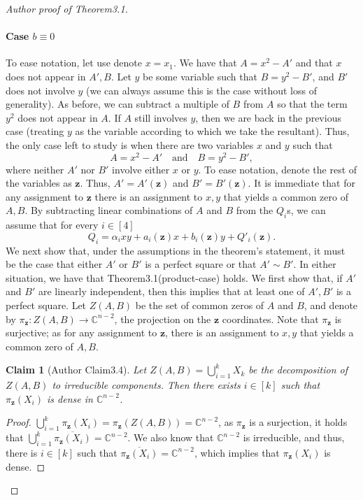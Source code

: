 \documentclass[10pt,a4paper]{article}
\newtheorem*{ntclaim}{Claim}
\begin{document}
\begin{proof}[Author proof of Theorem3.1]
\paragraph{Case $b\equiv0$}
To ease notation, let use denote $x=x_1$. We have that $A=x^2-A'$ and that $x$ does not appear in $A',B$. Let $y$ be some variable such that $B=y^2-B'$, and $B'$ does not involve $y$ (we can always assume this is the case without loss of generality). As before, we can subtract a multiple of $B$ from $A$ so that the term $y^2$ does not appear in $A$. If $A$ still involves $y$, then we are back in the previous case (treating $y$ as the variable according to which we take the resultant). Thus, the only case left to study is when there are two variables $x$ and $y$ such that
\[A=x^2-A'\quad\text{and}\quad B=y^2-B',\]
where neither $A'$ nor $B'$ involve either $x$ or $y$. To ease notation, denote the rest of the variables as $\mathbf z$. Thus, $A'=A'(\mathbf z)$ and $B'=B'(\mathbf z)$. It is immediate that for any assignment to $\mathbf z$ there is an assignment to $x,y$ that yields a common zero of $A,B$.
By subtracting linear combinations of $A$ and $B$ from the $Q_i$s, we can assume that for every $i\in[4]$
\[Q_i=\alpha_i xy+a_i(\mathbf z)x+b_i(\mathbf z)y+Q'_i(\mathbf z).\]
We next show that, under the assumptions in the theorem's statement, it must be the case that either $A'$ or $B'$ is a perfect square or that $A'\sim B'$. In either situation, we have that Theorem3.1(product-case) holds. We first show that, if $A'$ and $B'$ are linearly independent, then this implies that at least one of $A',B'$ is a perfect square.
Let $Z(A,B)$ be the set of common zeros of $A$ and $B$, and denote by $\pi_{\mathbf z}:Z(A,B)\to\mathbb C^{n-2}$, the projection on the $\mathbf z$ coordinates. Note that $\pi_{\mathbf z}$ is surjective; as for any assignment to $\mathbf z$, there is an assignment to $x,y$ that yields a common zero of $A,B$.
\begin{ntclaim}[Author Claim3.4]
Let $Z(A,B)=\bigcup_{i=1}^kX_k$ be the decomposition of $Z(A,B)$ to irreducible components. Then there exists $i\in[k]$ such that $\pi_{\mathbf z}(X_i)$ is dense in $\mathbb C^{n-2}$.
\end{ntclaim}
\begin{proof}
$\bigcup_{i=1}^k\pi_{\mathbf z}(X_i)=\pi_{\mathbf z}(Z(A,B))=\mathbb C^{n-2}$, as $\pi_{\mathbf z}$ is a surjection, it holds that $\bigcup_{i=1}^k\overline{\pi_{\mathbf z}(X_i)}=\mathbb C^{n-2}$. We also know that $\mathbb C^{n-2}$ is irreducible, and thus, there is $i\in[k]$ such that $\overline{\pi_{\mathbf z}(X_i)}=\mathbb C^{n-2}$, which implies that $\pi_{\mathbf z}(X_i)$ is dense.

\end{proof}
\end{proof}
\end{document}
